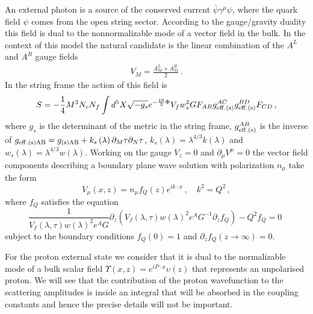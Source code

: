 \documentclass[a4paper,12pt]{article}
\begin{document}
An external photon is a source of the conserved current $\bar{\psi} \gamma^\mu \psi$, where the quark field $\psi$ comes from the open string sector. According to the gauge/gravity duality this field is dual to the nonnormalizable mode of a vector field in the bulk. In the context of this model the natural candidate is the linear combination of the $A^L$ and $A^R$ gauge fields
\begin{align}
V_M = \frac{A^L_M + A^R_M}{2} \,.
\end{align}
In the string frame the action of this field is
\begin{equation}
S = - \frac{1}{4} M^3 N_c N_f \int d^5 X \sqrt{-g_s} e^{-\frac{10}{3} \Phi} V_f w_s^2 G F_{AB}g^{AC}_{\rm{eff. (s)}}g^{BD}_{\rm{eff. (s)}}F_{CD} \, ,
\label{eq:VM_new_action_string_frame}
\end{equation}
where $g_s$ is the determinant of the metric in the string frame, $g^{AB}_{\rm{eff. (s)}}$ is the inverse of $g_{\rm{eff.(s)} AB} = g_{\rm{(s)} AB} +  k_s\left(\lambda\right) \partial_M \tau \partial_N \tau $, $k_s \left(\lambda\right) = \lambda^{4 / 3} k\left(\lambda\right) $ and $w_s \left(\lambda\right) = \lambda^{4 / 3} w\left(\lambda\right)$. Working on the gauge $V_z = 0$ and $\partial_\mu V^{\mu} = 0$ the vector field components describing a boundary plane wave solution with polarization $n_\mu$ take the form
\begin{equation}
V_\mu \left(x, z\right) = n_\mu f_Q \left(z\right) e^{i k \cdot x} \, , \quad k^2 = Q^2 \, ,
\end{equation}
where $f_Q$ satisfies the equation
\begin{equation}
\frac{1}{V_f(\lambda, \tau) w(\lambda)^2 e^A G} \partial_z (V_f(\lambda, \tau) w(\lambda)^2 e^A G^{-1} \partial_z f_Q) - Q^2 f_Q = 0 \, \,
\end{equation}
subject to the boundary conditions $f_Q\left(0\right) = 1$ and $\partial_z f_Q \left( z \to \infty \right) = 0$.

For the proton external state we consider that it is dual to the normalizable mode of a bulk scalar field $\Upsilon\left(x, z\right) = e^{i P \cdot x} \upsilon\left(z\right)$ that represents an unpolarised proton. We will see that the contribution of the proton wavefunction to the scattering amplitudes is inside an integral that will be absorbed in the coupling constants and hence the precise details will not be important.
\end{document}

